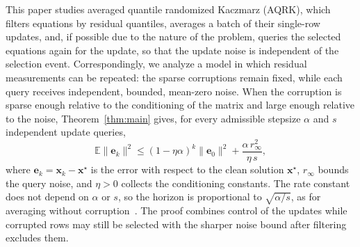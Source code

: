 \documentclass[pdflatex,sn-mathphys-num]{sn-jnl}
\theoremstyle{thmstyleone}
\theoremstyle{thmstylethree}
\newcommand{\vx}{\mathbf{x}}
\newcommand{\ve}{\mathbf{e}}
\begin{document}
This paper studies averaged quantile randomized Kaczmarz (AQRK), which filters
equations by residual quantiles, averages a batch of their single-row updates,
and, if possible due to the nature of the problem, queries the selected equations again for the update,
so that the update noise is independent of the selection event. 
Correspondingly, we analyze a model in which residual measurements can be repeated: the
sparse corruptions remain fixed, while each query receives independent,
bounded, mean-zero noise. When the corruption is sparse enough relative to the
conditioning of the matrix and large enough relative to the noise,
Theorem~\ref{thm:main} gives, for every admissible stepsize $\alpha$ and $s$
independent update queries,
\begin{equation}
\label{eq:intro-main-result}
\mathbb E\|\ve_k\|^2
\le(1-\eta\alpha)^k\|\ve_0\|^2+\frac{\alpha\,r_\infty^2}{\eta\,s},
\end{equation}
where $\ve_k=\vx_k-\vx^\star$ is the error with respect to the clean solution
$\vx^\star$, $r_\infty$ bounds the query noise, and $\eta>0$ collects the
conditioning constants. The rate constant does not depend on $\alpha$ or $s$,
so the horizon is proportional to $\sqrt{\alpha/s}$, as for averaging without
corruption~\cite{moorman2021randomized,tondji2026accelerated}. The proof
combines control of the updates while corrupted rows may still be selected with
the sharper noise bound after filtering excludes them.
\end{document}

